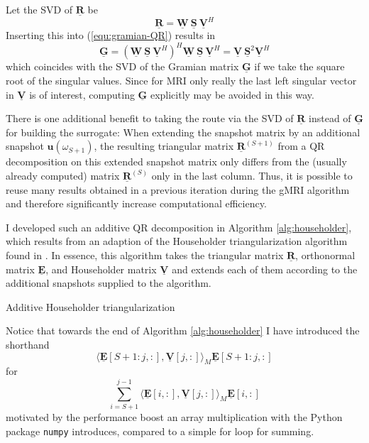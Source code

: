 \documentclass[11pt, a4paper]{article}
\begin{document}
Let the \acrshort{SVD} of $\mathbf{\underline{R}}$ be 
\begin{equation}
    \mathbf{\underline{R}} = \mathbf{\underline{W}}~\mathbf{\underline{S}}~\mathbf{\underline{V}}^H \label{equ:qr-decomposition}
\end{equation}
Inserting this into (\ref{equ:gramian-QR}) results in
\begin{equation}
    \mathbf{\underline{G}} = (\mathbf{\underline{W}}~\mathbf{\underline{S}}~\mathbf{\underline{V}}^H)^H \mathbf{\underline{W}}~\mathbf{\underline{S}}~\mathbf{\underline{V}}^H
    = \mathbf{\underline{V}}~\mathbf{\underline{S}}^2\mathbf{\underline{V}}^H
    \label{equ:gramian-SVD}
\end{equation}
which coincides with the \acrshort{SVD} of the Gramian matrix $\mathbf{\underline{G}}$
if we take the square root of the singular values. Since for \acrshort{MRI} only
really the last left singular vector in $\mathbf{\underline{V}}$ is of interest,
computing $\mathbf{\underline{G}}$ explicitly may be avoided in this way.

There is one additional benefit to taking the route via the \acrshort{SVD} of
$\mathbf{\underline{R}}$ instead of $\mathbf{\underline{G}}$
for building the surrogate: When extending the snapshot matrix by an additional
snapshot $\mathbf{u}(\omega_{S+1})$, the resulting triangular matrix $\mathbf{\underline{R}}^{(S+1)}$
from a QR decomposition on this extended snapshot matrix only differs from the 
(usually already computed) matrix $\mathbf{\underline{R}}^{(S)}$ only in the last column.
Thus, it is possible to reuse many results obtained in a previous iteration during
the \acrshort{gMRI} algorithm and therefore significantly increase computational
efficiency.

I developed such an additive QR decomposition in Algorithm \ref{alg:householder},
which results from an adaption of the Householder triangularization algorithm
found in \citep{householder}. In essence, this algorithm takes the triangular
matrix $\mathbf{\underline{R}}$, orthonormal matrix $\mathbf{\underline{E}}$,
and Householder matrix $\mathbf{\underline{V}}$ and extends each of them according
to the additional snapshots supplied to the algorithm.

\begin{algorithm}
    \caption{Additive Householder triangularization} \label{alg:householder}
    
\end{algorithm}

Notice that towards the end of Algorithm \ref{alg:householder} I have introduced the shorthand 
\begin{equation}
    \langle \mathbf{\underline{E}}[S+1:j, :], \mathbf{\underline{V}}[j, :] \rangle_M \mathbf{\underline{E}}[S+1:j, :]
\end{equation}
for 
\begin{equation}
    \sum_{i=S+1}^{j-1} \langle \mathbf{\underline{E}}[i, :], \mathbf{\underline{V}}[j, :] \rangle_M \mathbf{\underline{E}}[i, :]
\end{equation}
motivated by the performance boost an array multiplication with the Python package
\texttt{numpy} introduces, compared to a simple for loop for summing.
\end{document}
